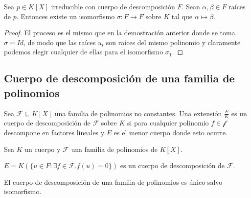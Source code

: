 \begin{corollary}
Sea $p \in K[X]$ irreducible con cuerpo de descomposición $F$. Sean $\alpha,\beta \in F$ raíces de $p$. Entonces existe un isomorfismo $\sigma:F \to F$ sobre $K$ tal que $\alpha \mapsto \beta$. 
\end{corollary}
\begin{proof}
El proceso es el mismo que en la demostración anterior donde se toma $\sigma = Id$, de modo que las raíces $u_i$ son raíces del mismo polinomio y claramente podemos elegir cualquier de ellas para el isomorfismo $\sigma_1$.
\end{proof}

\subsection{Cuerpo de descomposición de una familia de polinomios}

\begin{definition}
Sea $\mathcal{F} \subseteq K[X]$ una familia de polinomios no constantes. Una extensión $\frac{E}{K}$ es un cuerpo de descomposición de $\mathcal{F}$ sobre $K$ si para cualquier polinomio $f \in \mathcal{f}$ descompone en factores lineales y $E$ es el menor cuerpo donde esto ocurre.
\end{definition}

\begin{proposition}
Sea $K$ un cuerpo y $\mathcal{F}$ una familia de polinomios de $K[X]$.

$E = K(\{u \in F:\exists f \in \mathcal{F}. f(u) = 0\})$ es un cuerpo de descomposición de $\mathcal{F}$.
\end{proposition}

\begin{proposition}
El cuerpo de descomposición de una familia de polinomios es único salvo isomorfismo. 
\end{proposition}



